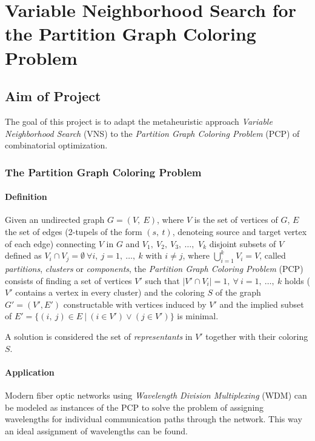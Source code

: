 \documentclass[paper = a4, fontsize = 10pt]{scrartcl}
\begin{document}
\section*{Variable Neighborhood Search for the Partition Graph Coloring Problem}

\subsection*{Aim of Project}

The goal of this project is to adapt the metaheuristic approach \textit{Variable Neighborhood Search} (VNS) to the \textit{Partition Graph Coloring Problem} (PCP) of combinatorial optimization.

\subsubsection*{The Partition Graph Coloring Problem}

\paragraph{Definition}
Given an undirected graph $G = (V,\ E)$, where $V$ is the set of vertices of $G$, $E$ the set of edges (2-tupels of the form $(s,\ t)$, denoteing source and target vertex of each edge) connecting $V$ in $G$ and $V_1,\ V_2,\ V_3,\ \ldots,$ $V_k$ disjoint subsets of $V$ defined as $V_i \cap V_j = \emptyset \ \forall i,\ j = 1,\ \ldots,\ k$ with $i \not = j$, where $\bigcup_{i = 1}^k V_i = V$, called \textit{partitions}, \textit{clusters} or \textit{components}, the \textit{Partition Graph Coloring Problem} (PCP) consists of finding a set of vertices $V'$ such that $|V' \cap V_i| = 1,\ \forall\ i = 1,\ \ldots,\ k$ holds ($V'$ contains a vertex in every cluster) and the coloring $S$ of the graph $G' = (V', E')$ constructable with vertices induced by $V'$ and the implied subset of $E' = \{(i,\ j) \in E\ |\ (i \in V') \vee (j \in V') \}$ is minimal.

A solution is considered the set of \textit{representants} in $V'$ together with their coloring $S$.

\paragraph{Application}
Modern fiber optic networks using \textit{Wavelength Division Multiplexing} (WDM) can be modeled as instances of the PCP to solve the problem of assigning wavelengths for individual communication paths through the network. This way an ideal assignment of wavelengths can be found.
\end{document}
